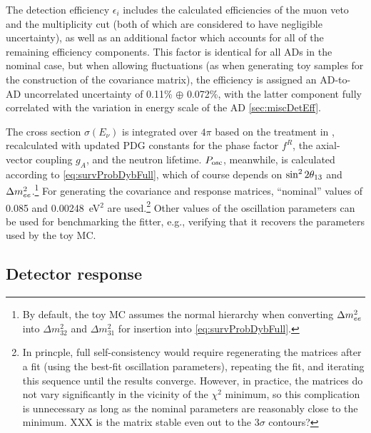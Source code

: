 \documentclass[../thesis.tex]{subfiles}
\begin{document}
The detection efficiency $\epsilon_i$ includes the calculated efficiencies of the muon veto and the multiplicity cut (both of which are considered to have negligible uncertainty), as well as an additional factor which accounts for all of the remaining efficiency components. This factor is identical for all ADs in the nominal case, but when allowing fluctuations (as when generating toy samples for the construction of the covariance matrix), the efficiency is assigned an AD-to-AD uncorrelated uncertainty of 0.11\% $\oplus$ 0.072\%, with the latter component fully correlated with the variation in energy scale of the AD \autoref{sec:miscDetEff}.

The cross section $\sigma(E_\nu)$ is integrated over $4\pi$ based on the treatment in \cite{Vogel_1999}, recalculated with updated PDG constants for the phase factor $f^R$, the axial-vector coupling $g_A$, and the neutron lifetime. $P_\mathrm{osc}$, meanwhile, is calculated according to \autoref{eq:survProbDybFull}, which of course depends on $\sin^2 2\theta_{13}$ and $\Delta m^2_{ee}$.\footnote{By default, the toy MC assumes the normal hierarchy when converting $\Delta m^2_{ee}$ into $\Delta m^2_{32}$ and $\Delta m^2_{31}$ for insertion into \autoref{eq:survProbDybFull}.} For generating the covariance and response matrices, ``nominal'' values of 0.085 and 0.00248~eV$^2$ are used.\footnote{In princple, full self-consistency would require regenerating the matrices after a fit (using the best-fit oscillation parameters), repeating the fit, and iterating this sequence until the results converge. However, in practice, the matrices do not vary significantly in the vicinity of the $\chi^2$ minimum, so this complication is unnecessary as long as the nominal parameters are reasonably close to the minimum. XXX is the matrix stable even out to the 3$\sigma$ contours?} Other values of the oscillation parameters can be used for benchmarking the fitter, e.g., verifying that it recovers the parameters used by the toy MC.

\subsection{Detector response}
\label{sec:fitToyDetResponse}
\end{document}
